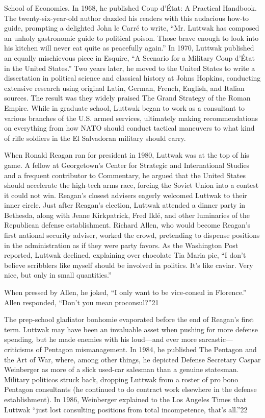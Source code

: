 School of Economics. In 1968, he published Coup d’État: A Practical Handbook. The twenty-six-year-old author dazzled his readers with this audacious how-to guide, prompting a delighted John le Carré to write, “Mr. Luttwak has composed an unholy gastronomic guide to political poison. Those brave enough to look into his kitchen will never eat quite as peacefully again.” In 1970, Luttwak published an equally mischievous piece in Esquire, “A Scenario for a Military Coup d’État in the United States.” Two years later, he moved to the United States to write a dissertation in political science and classical history at Johns Hopkins, conducting extensive research using original Latin, German, French, English, and Italian sources. The result was they widely praised The Grand Strategy of the Roman Empire. While in graduate school, Luttwak began to work as a consultant to various branches of the U.S. armed services, ultimately making recommendations on everything from how NATO should conduct tactical maneuvers to what kind of rifle soldiers in the El Salvadoran military should carry.
 \par 
When Ronald Reagan ran for president in 1980, Luttwak was at the top of his game. A fellow at Georgetown’s Center for Strategic and International Studies and a frequent contributor to Commentary, he argued that the United States should accelerate the high-tech arms race, forcing the Soviet Union into a contest it could not win. Reagan’s closest advisers eagerly welcomed Luttwak to their inner circle. Just after Reagan’s election, Luttwak attended a dinner party in Bethesda, along with Jeane Kirkpatrick, Fred Iklé, and other luminaries of the Republican defense establishment. Richard Allen, who would become Reagan’s first national security adviser, worked the crowd, pretending to dispense positions in the administration as if they were party favors. As the Washington Post reported, Luttwak declined, explaining over chocolate Tia Maria pie, “I don’t believe scribblers like myself should be involved in politics. It’s like caviar. Very nice, but only in small quantities.”
 \par 
When pressed by Allen, he joked, “I only want to be vice-consul in Florence.” Allen responded, “Don’t you mean proconsul?”{\color{blue}21}
 \par 
The prep-school gladiator bonhomie evaporated before the end of Reagan’s first term. Luttwak may have been an invaluable asset when pushing for more defense spending, but he made enemies with his loud—and ever more sarcastic—criticisms of Pentagon mismanagement. In 1984, he published The Pentagon and the Art of War, where, among other things, he depicted Defense Secretary Caspar Weinberger as more of a slick used-car salesman than a genuine statesman. Military politicos struck back, dropping Luttwak from a roster of pro bono Pentagon consultants (he continued to do contract work elsewhere in the defense establishment). In 1986, Weinberger explained to the Los Angeles Times that Luttwak “just lost consulting positions from total incompetence, that’s all.”{\color{blue}22}
